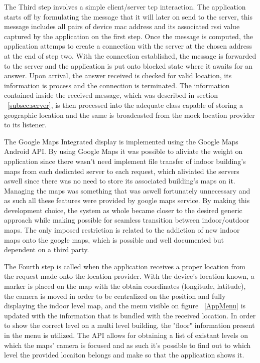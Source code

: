 \documentclass[a4paper]{IEEEtran}
\begin{document}
The Third step involves a simple client/server tcp interaction. The application starts off by formulating the message that it will later on send to the server, this message includes all pairs of device mac address and its associated rssi value captured by the application on the first step. Once the message is computed, the application attemps to create a connection with the server at the chosen address at the end of step two. With the connection established, the message is forwarded to the server and the application is put onto blocked state where it awaits for an answer. Upon arrival, the answer received is checked for valid location, its information is process and the connection is terminated. The information contained inside the received message, which was described in section ~\ref{subsec:server}, is then processed into the adequate class capable of storing a geographic location and the same is broadcasted from the mock location provider to its listener. 


The Google Maps Integrated display is implemented using the Google Maps Android API. By using Google Maps it was possible to aliviate the weight on application since there wasn't need implement file transfer of indoor building's maps from each dedicated server to each request, which aliviated the servers aswell since there was no need to store its associated building's maps on it. Managing the maps was something that was aswell fortunately unnecessary and as such all these features were provided by google maps service. By making this development choice, the system as whole became closer to the desired generic approach while making possible for seamless transition between indoor/outdoor maps. The only imposed restriction is related to the addiction of new indoor maps onto the google maps, which is possible and well documented but dependent on a third party.

The Fourth step is called when the application receives a proper location from the request made onto the location provider. With the device's location known, a marker is placed on the map with the obtain coordinates (longitude, latitude), the camera is moved in order to be centralized on the position and fully displaying the indoor level map, and the menu visible on figure ~\ref{AppMenu} is updated with the information that is bundled with the received location. In order to show the correct level on a multi level building, the "floor" information present in the menu is utilized. The API allows for obtaining a list of existant levels on which the maps' camera is focused and as such it's possible to find out to which level the provided locaiton belongs and make so that the application shows it.
\end{document}
